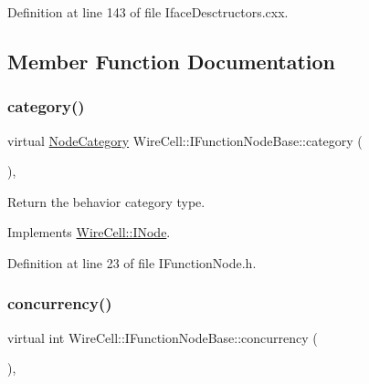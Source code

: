 Definition at line 143 of file Iface\+Desctructors.\+cxx.



\subsection{Member Function Documentation}
\mbox{\label{class_wire_cell_1_1_i_function_node_base_aea2adac35fc9aa54a82525ccb32471f7}} 
\subsubsection{\texorpdfstring{category()}{category()}}
{\footnotesize\ttfamily virtual \hyperlink{class_wire_cell_1_1_i_node_a5546e64cbb70bd3ac787295cac9ac803}{Node\+Category} Wire\+Cell\+::\+I\+Function\+Node\+Base\+::category (\begin{DoxyParamCaption}{ }\end{DoxyParamCaption})\hspace{0.3cm}{\ttfamily [inline]}, {\ttfamily [virtual]}}



Return the behavior category type. 



Implements \hyperlink{class_wire_cell_1_1_i_node_a58c07f15b165e5fb33bbc7b2e047b39b}{Wire\+Cell\+::\+I\+Node}.



Definition at line 23 of file I\+Function\+Node.\+h.

\mbox{\label{class_wire_cell_1_1_i_function_node_base_a19383abea731c6cbafc88fb9ffe11ee9}} 
\subsubsection{\texorpdfstring{concurrency()}{concurrency()}}
{\footnotesize\ttfamily virtual int Wire\+Cell\+::\+I\+Function\+Node\+Base\+::concurrency (\begin{DoxyParamCaption}{ }\end{DoxyParamCaption})\hspace{0.3cm}{\ttfamily [inline]}, {\ttfamily [virtual]}}



